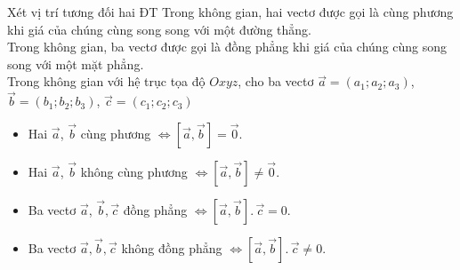 \begin{dang}{Xét vị trí tương đối hai ĐT}
	Trong không gian, hai vectơ được gọi là cùng phương khi giá của chúng cùng song song với một đường thẳng.\\
 Trong không gian, ba vectơ được gọi là đồng phẳng khi giá của chúng cùng song song với một mặt phẳng.\\
 Trong không gian với hệ trục tọa độ $Oxyz$, cho ba vectơ $\overrightarrow{a}=(a_{1} ;a_{2} ;a_{3} )$, $\overrightarrow{b}=(b_{1} ;b_{2} ;b_{3} )$, $\overrightarrow{c}=(c_{1} ;c_{2} ;c_{3} )$

\begin{itemize}
	\item  Hai $\overrightarrow{a}$, $\overrightarrow{b}$ cùng phương $\Leftrightarrow \left[\overrightarrow{a}, \overrightarrow{b}\right]=\overrightarrow{0}$.
	\item  Hai $\overrightarrow{a}$, $\overrightarrow{b}$ không cùng phương $\Leftrightarrow \left[\overrightarrow{a}, \overrightarrow{b}\right]\ne \overrightarrow{0}$.
	\item  Ba vectơ $\overrightarrow{a}$, $\overrightarrow{b},\overrightarrow{c}$ đồng phẳng $\Leftrightarrow \left[\overrightarrow{a}, \overrightarrow{b}\right].\, \overrightarrow{c}=0$.
	\item  Ba vectơ $\overrightarrow{a}, \overrightarrow{b}, \overrightarrow{c}$ không đồng phẳng $\Leftrightarrow \left[\overrightarrow{a}, \overrightarrow{b}\right].\, \overrightarrow{c}\ne 0$.
\end{itemize}


\end{dang}
